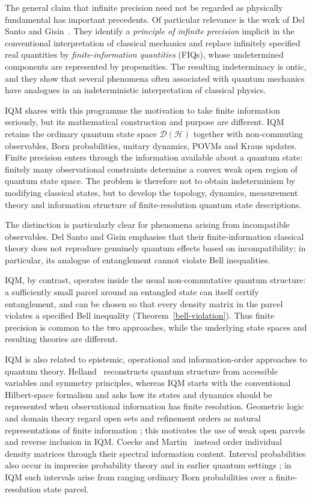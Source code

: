 \documentclass[11pt, onecolumn]{article}
\newcommand{\cH}{\mathcal{H}}
\newcommand{\cD}{\mathcal{D}}
\begin{document}
The general claim that infinite precision need not be regarded as physically
fundamental has important precedents. Of particular relevance is the work of
Del Santo and Gisin~\cite{DelSantoGisin2025}. They identify a
\emph{principle of infinite precision} implicit in the conventional
interpretation of classical mechanics and replace infinitely specified real
quantities by \emph{finite-information quantities} (FIQs), whose
undetermined components are represented by propensities. The resulting
indeterminacy is ontic, and they show that several phenomena often associated
with quantum mechanics have analogues in an indeterministic interpretation
of classical physics.

IQM shares with this programme the motivation to take finite information
seriously, but its mathematical construction and purpose are different.
IQM retains the ordinary quantum state space $\cD(\cH)$ together with
non-commuting observables, Born probabilities, unitary dynamics, POVMs and
Kraus updates. Finite precision enters through the information available
about a quantum state: finitely many observational constraints determine a
convex weak open region of quantum state space. The problem is therefore not
to obtain indeterminism by modifying classical states, but to develop the
topology, dynamics, measurement theory and information structure of
finite-resolution quantum state descriptions.

The distinction is particularly clear for phenomena arising from
incompatible observables. Del Santo and Gisin emphasise that their
finite-information classical theory does not reproduce genuinely quantum
effects based on incompatibility; in particular, its analogue of
entanglement cannot violate Bell inequalities.

IQM, by contrast, operates inside the usual non-commutative quantum
structure: a sufficiently small parcel around an entangled state can itself
certify entanglement, and can be chosen so that every density matrix in the
parcel violates a specified Bell inequality (Theorem~\ref{bell-violation}).
Thus finite precision is common to the two approaches, while the underlying
state spaces and resulting theories are different.

IQM is also related to epistemic, operational and information-order
approaches to quantum theory. Helland~\cite{Helland2024} reconstructs
quantum structure from accessible variables and symmetry principles, whereas
IQM starts with the conventional Hilbert-space formalism and asks how its
states and dynamics should be represented when observational information has
finite resolution. Geometric logic and domain theory regard open sets and
refinement orders as natural representations of finite information
\cite{johnstone1982stone,vic89,abramsky1991domain,scott1970outline,
smyth1983,abramsky_domain_1994}; this motivates the use of weak open parcels
and reverse inclusion in IQM. Coecke and Martin~\cite{coecke2010partial}
instead order individual density matrices through their spectral information
content. Interval probabilities also occur in imprecise probability theory
\cite{walley1991statistical} and in earlier quantum settings
\cite{hartle1968quantum}; in IQM such intervals arise from ranging ordinary
Born probabilities over a finite-resolution state parcel.
\end{document}
